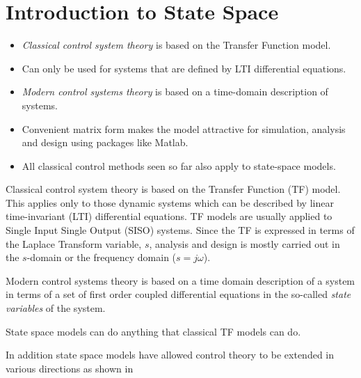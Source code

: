 \def\FileDate{9/9/29}
\def\FileVersion{1.1}
\section*{Introduction to State Space}

\begin{slide}\label{slides:l13s1}
\begin{itemize}
	\item \emph{Classical control system theory} is based on the Transfer Function model.
	\item Can only be used for systems that are defined by LTI differential equations.
	\item \emph{Modern control systems theory} is based on a time-domain description of systems.
	\item Convenient matrix form makes the model attractive for simulation, analysis and design using packages like Matlab.
	\item All classical control methods seen so far also apply to state-space models.
\end{itemize}
\end{slide}

Classical control system theory is based on the Transfer Function (TF) model. This applies only to those dynamic systems which can be described by linear time-invariant (LTI) differential equations. TF models are usually applied to Single Input Single Output (SISO) systems. Since the TF is expressed in terms of the Laplace Transform variable, $s$, analysis and design is mostly carried out in the $s$-domain or the frequency domain ($s=j\omega$).

Modern control systems theory is based on a time domain description of a system in terms of a set of first order coupled differential equations in the so-called \emph{state variables} of the system.

State space models can do anything that classical TF models can do.

In addition state space models have allowed control theory to be extended in various directions as shown in 


